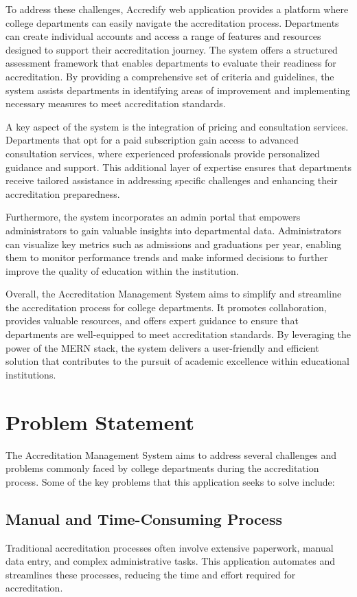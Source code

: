 \documentclass[a4paper,11pt]{report}
\begin{document}
To address these challenges, Accredify web application provides a  platform where college departments can easily navigate the accreditation process. Departments can create individual accounts and access a range of features and resources designed to support their accreditation journey. The system offers a structured assessment framework that enables departments to evaluate their readiness for accreditation. By providing a comprehensive set of criteria and guidelines, the system assists departments in identifying areas of improvement and implementing necessary measures to meet accreditation standards.

A key aspect of the system is the integration of pricing and consultation services. Departments that opt for a paid subscription gain access to advanced consultation services, where experienced professionals provide personalized guidance and support. This additional layer of expertise ensures that departments receive tailored assistance in addressing specific challenges and enhancing their accreditation preparedness.

Furthermore, the system incorporates an admin portal that empowers administrators to gain valuable insights into departmental data. Administrators can visualize key metrics such as admissions and graduations per year, enabling them to monitor performance trends and make informed decisions to further improve the quality of education within the institution.

Overall, the Accreditation Management System aims to simplify and streamline the accreditation process for college departments. It promotes collaboration, provides valuable resources, and offers expert guidance to ensure that departments are well-equipped to meet accreditation standards. By leveraging the power of the MERN stack, the system delivers a user-friendly and efficient solution that contributes to the pursuit of academic excellence within educational institutions.
  

  
\chapter{Problem Statement}
The Accreditation Management System aims to address several challenges and problems commonly faced by college departments during the accreditation process. Some of the key problems that this application seeks to solve include:	

\section{Manual and Time-Consuming Process}
Traditional accreditation processes often involve extensive paperwork, manual data entry, and complex administrative tasks. This application automates and streamlines these processes, reducing the time and effort required for accreditation.
\end{document}
